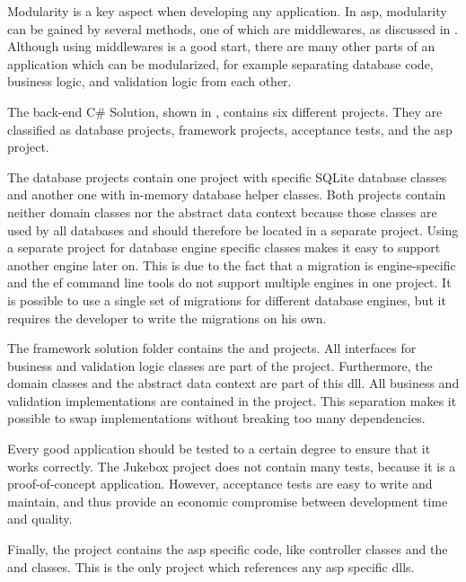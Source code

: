 Modularity is a key aspect when developing any application. In \gls{asp}, modularity can be gained by several methods, one of which are middlewares, as discussed in . Although using middlewares is a good start, there are many other parts of an application which can be modularized, for example separating database code, business logic, and validation logic from each other.


The back-end C\# Solution, shown in , contains six different projects. They are classified as database projects, framework projects, acceptance tests, and the \gls{asp} project.

The database projects contain one project with specific SQLite database classes and another one with in-memory database helper classes. Both projects contain neither domain classes nor the abstract data context because those classes are used by all databases and should therefore be located in a separate project. Using a separate project for database engine specific classes makes it easy to support another engine later on. This is due to the fact that a migration is engine-specific and the \gls{ef} command line tools do not support multiple engines in one project. It is possible to use a single set of migrations for different database engines, but it requires the developer to write the migrations on his own.

The framework solution folder contains the  and  projects. All interfaces for business and validation logic classes are part of the  project. Furthermore, the domain classes and the abstract data context are part of this \gls{dll}. All business and validation implementations are contained in the  project. This separation makes it possible to swap implementations without breaking too many dependencies.

Every good application should be tested to a certain degree to ensure that it works correctly. The Jukebox project does not contain many tests, because it is a proof-of-concept application. However, acceptance tests are easy to write and maintain, and thus provide an economic compromise between development time and quality.

Finally, the  project contains the \gls{asp} specific code, like controller classes and the  and  classes. This is the only project which references any \gls{asp} specific \glspl{dll}.

